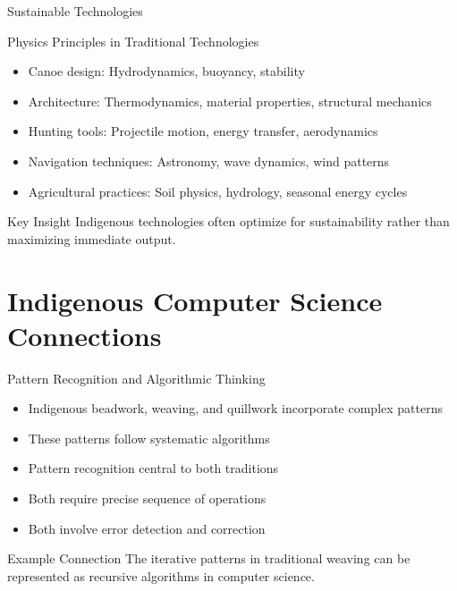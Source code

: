 \documentclass{beamer}
\begin{document}
\begin{frame}{Sustainable Technologies}
    \begin{block}{Physics Principles in Traditional Technologies}
        \begin{itemize}
            \item Canoe design: Hydrodynamics, buoyancy, stability
            \item Architecture: Thermodynamics, material properties, structural mechanics
            \item Hunting tools: Projectile motion, energy transfer, aerodynamics
            \item Navigation techniques: Astronomy, wave dynamics, wind patterns
            \item Agricultural practices: Soil physics, hydrology, seasonal energy cycles
        \end{itemize}
    \end{block}
    
    \begin{alertblock}{Key Insight}
        Indigenous technologies often optimize for sustainability rather than maximizing immediate output.
    \end{alertblock}
\end{frame}

\section{Indigenous Computer Science Connections}

\begin{frame}{Pattern Recognition and Algorithmic Thinking}
   
        \begin{itemize}
            \item Indigenous beadwork, weaving, and quillwork incorporate complex patterns
            \item These patterns follow systematic algorithms
            \item Pattern recognition central to both traditions
            \item Both require precise sequence of operations
            \item Both involve error detection and correction
        \end{itemize}
    
    \begin{exampleblock}{Example Connection}
        The iterative patterns in traditional weaving can be represented as recursive algorithms in computer science.
    \end{exampleblock}
\end{frame}
\end{document}
